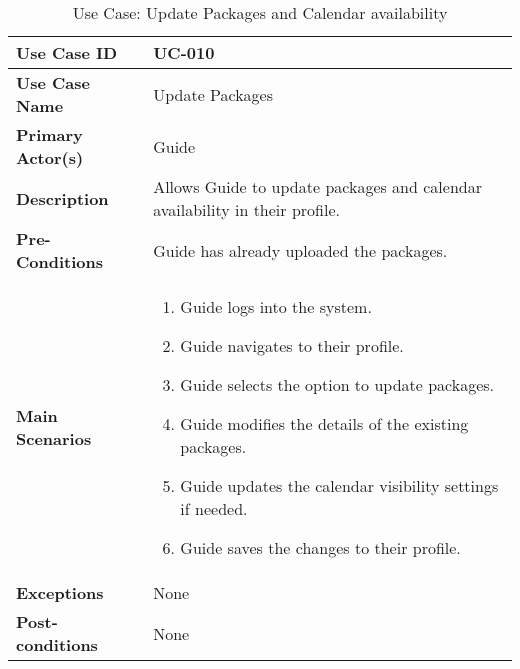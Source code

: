 \begin{table}[ht]
    \centering
    \begin{tabular}{|l|p{}|}
        \hline
        \textbf{Use Case ID} & UC-010 \\
        \hline
        \textbf{Use Case Name} & Update Packages \\
        \hline
        \textbf{Primary Actor(s)} & Guide \\
        \hline
        \textbf{Description} & Allows Guide to update packages and calendar availability in their profile. \\
        \hline
        \textbf{Pre-Conditions} & Guide has already uploaded the packages. \\
        \hline
        \textbf{Main Scenarios} & 
        \begin{enumerate}[label=\arabic*.,itemsep=0pt]
            \item Guide logs into the system.
            \item Guide navigates to their profile.
            \item Guide selects the option to update packages.
            \item Guide modifies the details of the existing packages.
            \item Guide updates the calendar visibility settings if needed.
            \item Guide saves the changes to their profile.
        \end{enumerate} \\
        \hline
        \textbf{Exceptions} & None \\
        \hline
        \textbf{Post-conditions} & None \\
        \hline
    \end{tabular}
    \label{tab:use-case-update-packages}
    \caption{Use Case: Update Packages and Calendar availability}
\end{table}


